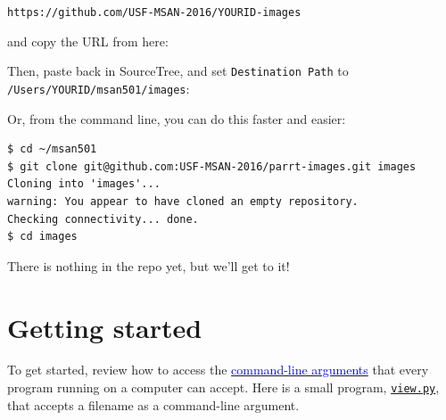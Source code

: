 \documentclass[titlepage]{tufte-book}
\begin{document}
{\tt https://github.com/USF-MSAN-2016/YOURID-images}

\noindent and copy the URL from here:


\noindent Then, paste back in SourceTree, and set {\tt Destination Path} to {\tt /Users/YOURID/msan501/images}:


\noindent Or, from the command line, you can do this faster and easier:

\begin{lstlisting}[style=BashInputStyle]
$ cd ~/msan501
$ git clone git@github.com:USF-MSAN-2016/parrt-images.git images
Cloning into 'images'...
warning: You appear to have cloned an empty repository.
Checking connectivity... done.
$ cd images
\end{lstlisting}

\noindent There is nothing in the repo yet, but we'll get to it!

\section{Getting started}

To get started, review how to access the \href{http://stackoverflow.com/questions/4117530/sys-argv1-meaning-in-script}{\textcolor{blue}{command-line arguments}} that every program running on a computer can accept. Here is a small program, \href{https://github.com/parrt/msan501/blob/master/projects/code/images/view.py}{\tt view.py}, that accepts a filename as a command-line argument.
\end{document}
